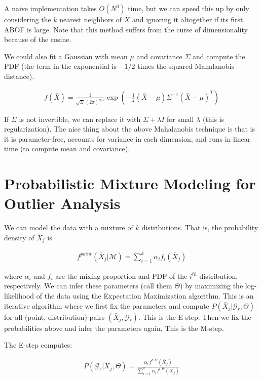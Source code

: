 \documentclass[a4paper]{article}
\begin{document}
A naive implementation takes $O(N^3)$ time, but we can speed this up by only
considering the $k$ nearest neighbors of $\bar{X}$ and ignoring it altogether if
its first ABOF is large. Note that this method suffers from the curse of
dimensionality because of the cosine.

We could also fit a Gaussian with mean $\mu$ and covariance $\Sigma$ and compute
the PDF (the term in the exponential is $-1/2$ times the squared
Mahalanobis distance).

\begin{align}
  f(\bar{X}) = \frac{1}{\sqrt{\Sigma} (2 \pi)^{d/2}} \exp{(
  - \frac{1}{2} (\bar{X} - \mu)\Sigma^{-1}(\bar{X} - \mu)^T
  )}
\end{align}

If $\Sigma$ is not invertible, we can replace it with $\Sigma + \lambda I$ for
small $\lambda$ (this is regularization). The nice thing about the above
Mahalanobis technique is that is it is parameter-free, accounts for variance
in each dimension, and runs in linear time (to compute mean and covariance).

\section{Probabilistic Mixture Modeling for Outlier Analysis}
We can model the data with a mixture of $k$ distributions. That is, the
probability density of $\bar{X}_j$ is

\begin{align}
  f^{point}(\bar{X}_j | \mathcal{M}) = \sum_{i=1}^{k}{\alpha_i f_i(\bar{X}_j)}
\end{align}

where $\alpha_i$ and $f_i$ are the mixing proportion and PDF of the $i^{th}$
distribution, respectively. We can infer these parameters (call them $\Theta$)
by maximizing the log-likelihood of the data using the Expectation Maximization
algorithm. This is an iterative algorithm where we first fix the parameters and
compute $P(\bar{X}_j | \mathcal{G}_r, \Theta)$ for all (point, distribution)
pairs $(\bar{X}_j, \mathcal{G}_r)$. This is the E-step. Then we fix the
probabilities above and infer the parameters again. This is the M-step.

The E-step computes:

\begin{align}
  P(\mathcal{G}_r | \bar{X}_j, \Theta)
    = \frac{\alpha_r f^{r, \Theta}(\bar{X}_j)}{
    \sum_{i=1}^{k}{\alpha_i f^{i, \Theta}(\bar{X}_j)}}
\end{align}
\end{document}
